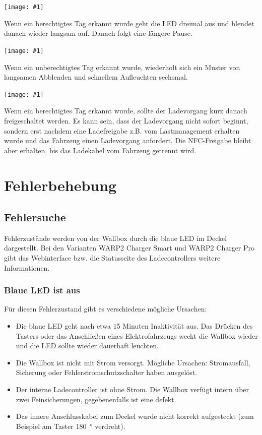 \documentclass[a4paper,10pt]{article}
\newcommand{\gfx}[1]{\texttt{[image: \#1]}}
\begin{document}
\begin{multicols*}{2}
    \gfx{./img_warp2/resized/blink_nag}

    Wenn ein berechtigtes Tag erkannt wurde geht die LED
    dreimal aus und blendet danach wieder langsam auf. Danach folgt eine längere Pause.

    \gfx{./img_warp2/resized/blink_ack}

    Wenn ein unberechtigtes Tag erkannt wurde, wiederholt sich ein Muster von langsamen Abblenden
    und schnellem Aufleuchten sechsmal.

    \gfx{./img_warp2/resized/blink_nack}

    Wenn ein berechtigtes Tag erkannt wurde, sollte der Ladevorgang kurz danach
    freigeschaltet werden. Es kann sein, dass der Ladevorgang nicht
    sofort beginnt, sondern erst nachdem eine Ladefreigabe z.B. vom Lastmanagement erhalten wurde
    und das Fahrzeug einen Ladevorgang anfordert. Die NFC-Freigabe bleibt aber erhalten,
    bis das Ladekabel vom Fahrzeug getrennt wird.

    \newpage \section{Fehlerbehebung}\label{fehlerbehebung} \subsection{Fehlersuche}
    Fehlerzustände werden von der Wallbox durch die blaue LED im Deckel
    dargestellt. Bei den Varianten WARP2 Charger Smart und WARP2 Charger Pro
    gibt das Webinterface bzw. die Statusseite des Ladecontrollers
    weitere Informationen.

    \subsubsection*{Blaue LED ist aus}
    Für diesen Fehlerzustand gibt es verschiedene mögliche Ursachen:
    \begin{itemize}
        \item Die blaue LED geht nach etwa 15 Minuten Inaktivität aus. Das Drücken des Tasters
              oder das Anschließen eines Elektrofahrzeugs weckt die Wallbox wieder
              und die LED sollte wieder dauerhaft leuchten.
        \item Die Wallbox ist nicht mit Strom versorgt. Mögliche Ursachen: Stromausfall,
              Sicherung oder Fehlerstrom\-schutzschalter haben ausgelöst.
        \item Der interne Ladecontroller ist ohne Strom. Die Wallbox verfügt intern über zwei
              Feinsicherungen, gegebenenfalls ist eine defekt.
        \item Das innere Anschlusskabel zum Deckel wurde nicht korrekt aufgesteckt (zum Beispiel am Taster \SI{180}{\degree} verdreht).
    \end{itemize}


\end{multicols*}
\end{document}

